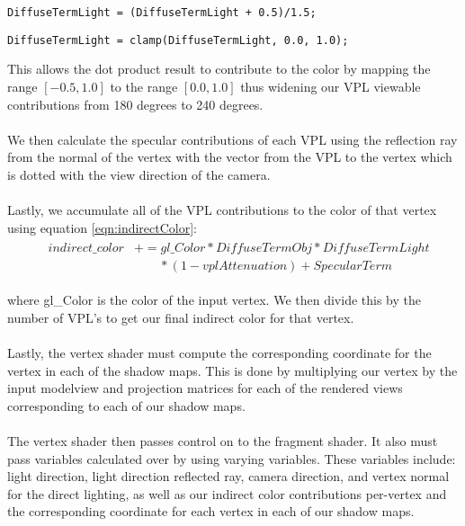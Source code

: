 \begin{lstlisting}
DiffuseTermLight = (DiffuseTermLight + 0.5)/1.5;
\end{lstlisting}

\begin{lstlisting}
DiffuseTermLight = clamp(DiffuseTermLight, 0.0, 1.0);
\end{lstlisting}

This allows the dot product result to contribute to the color by mapping the range $[-0.5, 1.0]$ to the range $[0.0, 1.0]$ thus widening our VPL viewable contributions from 180 degrees to 240 degrees.

\paragraph{}
We then calculate the specular contributions of each VPL using the reflection ray from the normal of the vertex with the vector from the VPL to the vertex which is dotted with the view direction of the camera.

\paragraph{}
Lastly, we accumulate all of the VPL contributions to the color of that vertex using equation \ref{eqn:indirectColor}:
\begin{align}
  &\begin{aligned} \label{eqn:indirectColor}
    indirect\_color &+= gl\_Color*DiffuseTermObj*DiffuseTermLight\\
      &\qquad *(1-vplAttenuation)+SpecularTerm
  \end{aligned}
\end{align}

where gl\_Color is the color of the input vertex.  We then divide this by the number of VPL's to get our final indirect color for that vertex.

\paragraph{}
Lastly, the vertex shader must compute the corresponding coordinate for the vertex in each of the shadow maps.  This is done by multiplying our vertex by the input modelview and projection matrices for each of the rendered views corresponding to each of our shadow maps.

\paragraph{}
The vertex shader then passes control on to the fragment shader.  It also must pass variables calculated over by using varying variables.  These variables include: light direction, light direction reflected ray, camera direction, and vertex normal for the direct lighting, as well as our indirect color contributions per-vertex and the corresponding coordinate for each vertex in each of our shadow maps.

